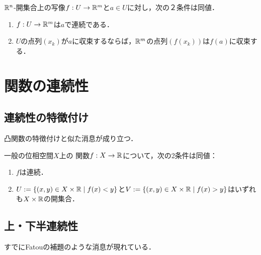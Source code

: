\documentclass[uplatex,dvipdfmx]{jsreport}
\begin{document}
\begin{proposition}[連続写像の点列による特徴付け]
    $\mathbb{R}^n$-開集合上の写像$f:U\to\mathbb{R}^m$と$a\in U$に対し，次の２条件は同値．
    \begin{enumerate}
        \item $f:U\to\mathbb{R}^m$は$a$で連続である．
        \item $U$の点列$(x_k)$が$a$に収束するならば，$\mathbb{R}^m$の点列$(f(x_k))$は$f(a)$に収束する．
    \end{enumerate}
\end{proposition}

\section{関数の連続性}

\subsection{連続性の特徴付け}

\begin{tcolorbox}[colframe=ForestGreen, colback=ForestGreen!10!white,breakable,colbacktitle=ForestGreen!40!white,coltitle=black,fonttitle=\bfseries\sffamily,
title=]
    凸関数の特徴付けと似た消息が成り立つ．
\end{tcolorbox}

\begin{proposition}
    一般の位相空間$X$上の
    関数$f:X\to\mathbb{R}$について，次の2条件は同値：
    \begin{enumerate}
        \item $f$は連続．
        \item $U:=\left\{(x,y)\in X\times\mathbb{R}\mid f(x)<y\right\}$と$V:=\left\{(x,y)\in X\times\mathbb{R}\mid f(x)>y\right\}$はいずれも$X\times\mathbb{R}$の開集合．
    \end{enumerate}
\end{proposition}

\subsection{上・下半連続性}

\begin{tcolorbox}[colframe=ForestGreen, colback=ForestGreen!10!white,breakable,colbacktitle=ForestGreen!40!white,coltitle=black,fonttitle=\bfseries\sffamily,
title=]
    すでにFatouの補題のような消息が現れている．
\end{tcolorbox}
\end{document}
